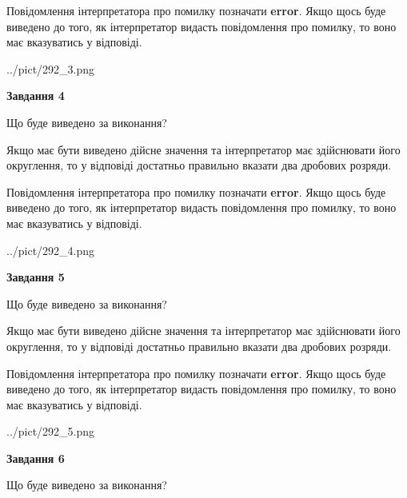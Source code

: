 \documentclass[12pt, ukrainian]{article}
\begin{document}
{\begin {Large}
Повідомлення інтерпретатора про помилку позначати \textbf{error}.
Якщо щось буде виведено до того, як інтерпретатор видасть повідомлення про помилку, 
то воно має вказуватись у відповіді. \par

\begin{center}
	{../pict/292_3.png}
\end{center}
\newpage

{\begin {center}\textbf{Завдання 4}\end {center}}\par
Що буде виведено за виконання? \par

Якщо має бути виведено дійсне значення та інтерпретатор має здійснювати його округлення, 
то у відповіді достатньо правильно вказати два дробових розряди.

Повідомлення інтерпретатора про помилку позначати \textbf{error}.
Якщо щось буде виведено до того, як інтерпретатор видасть повідомлення про помилку, 
то воно має вказуватись у відповіді. \par

\begin{center}
	{../pict/292_4.png}
\end{center}
\newpage

{\begin {center}\textbf{Завдання 5}\end {center}}\par
Що буде виведено за виконання? \par

Якщо має бути виведено дійсне значення та інтерпретатор має здійснювати його округлення, 
то у відповіді достатньо правильно вказати два дробових розряди.

Повідомлення інтерпретатора про помилку позначати \textbf{error}.
Якщо щось буде виведено до того, як інтерпретатор видасть повідомлення про помилку, 
то воно має вказуватись у відповіді. \par

\begin{center}
	{../pict/292_5.png}
\end{center}
\newpage

{\begin {center}\textbf{Завдання 6}\end {center}}\par
Що буде виведено за виконання? \par


\end{Large}}
\end{document}
